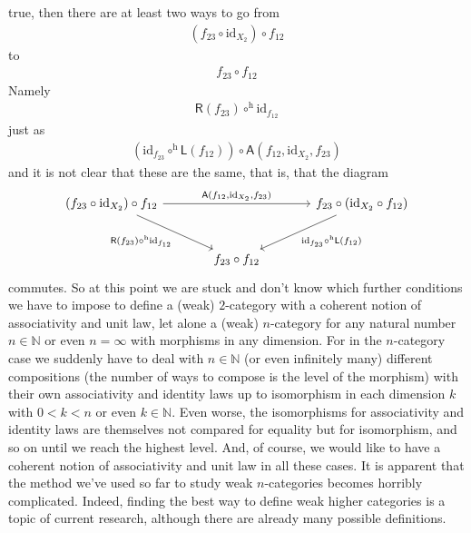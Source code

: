 true, then there are at least two ways to go from
\begin{align*}
  \left(
    f_{23}
    \circ
    \mathrm{id}_{X_{2}}
  \right)
  \circ
  f_{12}
\end{align*}
to
\begin{align*}
  f_{23}
  \circ
  f_{12}
\end{align*}
Namely
\begin{align*}
  \mathsf{R}(f_{23})
  \circ^{\textrm{h}}
  \mathrm{id}_{f_{12}}
\end{align*}
just as
\begin{align*}
  \left(
    \mathrm{id}_{f_{23}}
    \circ^{\textrm{h}}
    \mathsf{L}(f_{12})
  \right)
  \circ
  \mathsf{A}(f_{12},\mathrm{id}_{X_{2}},f_{23})
\end{align*}
and it is not clear that these are the same, that is, that the diagram
\[
\begin{tikzcd}[sep=large]
  \left(
    f_{23}
    \circ
    \mathrm{id}_{X_{2}}
  \right)
  \circ
  f_{12}
  \arrow{rr}{\mathsf{A}(f_{12},\mathrm{id}_{X_{2}},f_{23})}
  \arrow[swap]{dr}{\mathsf{R}(f_{23}) \circ^{\textrm{h}} \mathrm{id}_{f_{12}}}
  &
  &
  f_{23}
  \circ
  \left(
    \mathrm{id}_{X_{2}}
    \circ
    f_{12}
  \right)
  \arrow{dl}{\mathrm{id}_{f_{23}} \circ^{\textrm{h}} \mathsf{L}(f_{12})}
  \\
  &
  f_{23}
  \circ
  f_{12}
  &
\end{tikzcd}
\]
commutes.
So at this point we are stuck and don't know which further conditions we have to impose to define a (weak) $2$-category with a {\glqq}coherent{\grqq} notion of associativity and unit law, let alone a (weak) $n$-category for any natural number $n \in \mathbb{N}$ or even $n = \infty$ with morphisms in any dimension.
For in the $n$-category case we suddenly have to deal with $n \in \mathbb{N}$ (or even infinitely many) different compositions (the number of ways to compose is the level of the morphism) with their own associativity and identity laws up to isomorphism in each dimension $k$ with $0 < k < n$ or even $k \in \mathbb{N}$.
Even worse, the isomorphisms for associativity and identity laws are themselves not compared for equality but for isomorphism, and so on until we reach the highest level.
And, of course, we would like to have a {\glqq}coherent{\grqq} notion of associativity and unit law in all these cases.
It is apparent that the method we've used so far to study weak $n$-categories becomes horribly complicated.
Indeed, finding the best way to define weak higher categories is a topic of current research, although there are already many possible definitions.

